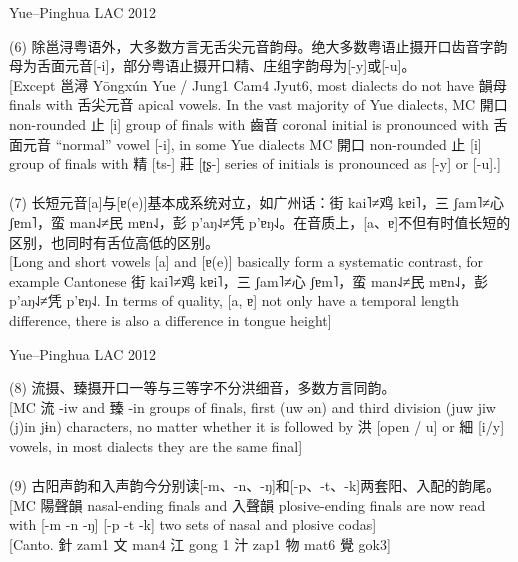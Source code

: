 \documentclass{beamer}
\begin{document}
\begin{frame}[fragile]{Yue–Pinghua \scriptsize{LAC 2012}}

{\small
(6) 除邕浔粤语外，大多数方言无舌尖元音韵母。绝大多数粤语止摄开口齿音字韵母为舌面元音[-i]，部分粤语止摄开口精、庄组字韵母为[-y]或[-u]。\\
{\scriptsize[Except 邕潯 Yōngxún Yue / Jung1 Cam4 Jyut6, most dialects do not have 韻母 finals with 舌尖元音 apical vowels. In the vast majority of Yue dialects, MC 開口 non-rounded 止 [i] group of finals with 齒音 coronal initial is pronounced with 舌面元音 \enquote{normal} vowel [-i], in some Yue dialects MC 開口 non-rounded 止 [i] group of finals with 精 [ts-] 莊 [ʈʂ-] series of initials is pronounced as [-y] or [-u].]}\\
\\
\medskip
(7) 长短元音[a]与[ɐ(e)]基本成系统对立，如广州话：街 kai˥≠鸡 kɐi˥，三 ʃam˥≠心 ʃɐm˥，蛮 man˨˩≠民 mɐn˨˩，彭 p'aŋ˨˩≠凭 p'ɐŋ˨˩。在音质上，[a、ɐ]不但有时值长短的区别，也同时有舌位高低的区别。\\
{\scriptsize[Long and short vowels [a] and [ɐ(e)] basically form a systematic contrast, for example Cantonese 街 kai˥≠鸡 kɐi˥，三 ʃam˥≠心 ʃɐm˥，蛮 man˨˩≠民 mɐn˨˩，彭 p'aŋ˨˩≠凭 p'ɐŋ˨˩. In terms of quality, [a, ɐ] not only have a temporal length difference, there is also a difference in tongue height]}
}
\end{frame}

\begin{frame}[fragile]{Yue–Pinghua \scriptsize{LAC 2012}}

{\small
(8) 流摄、臻摄开口一等与三等字不分洪细音，多数方言同韵。\\
{\scriptsize[MC 流 -iw and 臻 -in groups of finals, first (uw ən) and third division (juw jiw (j)in jɨn) characters, no matter whether it is followed by 洪 [open / u] or 細 [i/y] vowels, in most dialects they are the same final]}\\
\smallskip
[Canto. 樓=流 lau4, 走=酒 zau2, 狗=九 gau2, 根=斤 gan1]\\
\medskip
(9) 古阳声韵和入声韵今分别读[-m、-n、-ŋ]和[-p、-t、-k]两套阳、入配的韵尾。\\
{\scriptsize[MC 陽聲韻 nasal-ending finals and 入聲韻 plosive-ending finals are now read with [-m -n -ŋ] [-p -t -k] two sets of nasal and plosive codas]}\\
\smallskip
{[Canto. 針 zam1 文 man4 江 gong 1 汁 zap1 物 mat6 覺 gok3]}\\
}
\end{frame}
\end{document}
